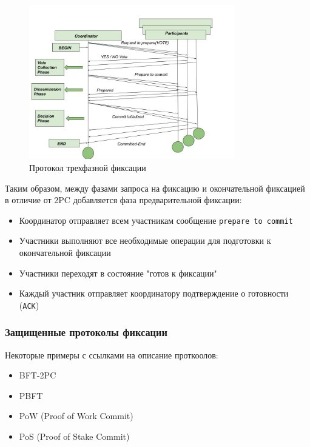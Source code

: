 \begin{figure}[h!]
    \centering
    \includegraphics[width=0.8\textwidth]{assets/distributed/3PhaseCommit.png}
    \caption{Протокол трехфазной фиксации}
    \label{3pc}
\end{figure}

Таким образом, между фазами запроса на фиксацию и окончательной фиксацией в отличие от 2PC добавляется фаза предварительной фиксации:

\begin{itemize}
    \item Координатор отправляет всем участникам сообщение \texttt{prepare to commit}
    \item Участники выполняют все необходимые операции для подготовки к окончательной фиксации
    \item Участники переходят в состояние "готов к фиксации"
    \item Каждый участник отправляет координатору подтверждение о готовности (\texttt{ACK})
\end{itemize}

\subsubsection{Защищенные протоколы фиксации}

Некоторые примеры с ссылками на описание проткоолов:

\begin{itemize}
    \item BFT-2PC \autocite{BFT-2PC}
    \item PBFT \autocite{PBFT}
    \item PoW (Proof of Work Commit) \autocite{PoS_PoW}
    \item PoS (Proof of Stake Commit) \autocite{PoS_PoW}
\end{itemize}

